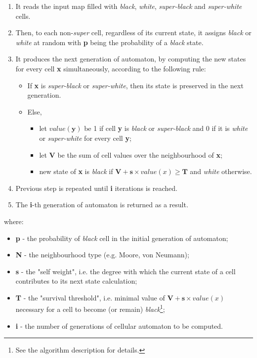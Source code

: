 \documentclass[a4paper, 11pt]{article} %
\begin{document}
\begin{enumerate}
	\item It reads the input map filled with \emph{black}, \emph{white}, \emph{super-black} and \emph{super-white} cells.
	\item Then, to each non-\emph{super} cell, regardless of its current state, it assigns \emph{black} or \emph{white} at random with \textbf{p} being the probability of a \emph{black} state.
	\item It produces the next generation of automaton, by computing the new states for every cell \textbf{x} simultaneously, according to the following rule:
		\begin{itemize}
			\item If \textbf{x} is \emph{super-black} or \emph{super-white}, then its state is preserved in the next generation.
			\item Else,
				\begin{itemize}
					\item let $value(\textbf{y})$ be 1 if cell \textbf{y} is \emph{black} or \emph{super-black} and 0 if it is \emph{white} or \emph{super-white} for every cell \textbf{y};
					\item let \textbf{V} be the sum of cell values over the neighbourhood of \textbf{x};
					\item new state of \textbf{x} is \emph{black} if $\textbf{V} + \textbf{s} \times value(x) \geq \textbf{T}$ and \emph{white} otherwise.
				\end{itemize}
		\end{itemize}
	\item Previous step is repeated until \textbf{i} iterations is reached.
	\item The \textbf{i}-th generation of automaton is returned as a result.
\end{enumerate}
where:

\begin{itemize}
	\item \textbf{p} - the probability of \emph{black} cell in the initial generation of automaton;
	\item \textbf{N} - the neighbourhood type (e.g. Moore, von Neumann);
	\item \textbf{s} - the "self weight", i.e. the degree with which the current state of a cell contributes to its next state calculation;
	\item \textbf{T} - the "survival threshold", i.e. minimal value of $\textbf{V} + \textbf{s} \times value(x)$  necessary for a cell to become (or remain) \emph{black}\footnote{See the algorithm description for details.};
	\item \textbf{i} - the number of generations of cellular automaton to be computed.
\end{itemize}
\end{document}
